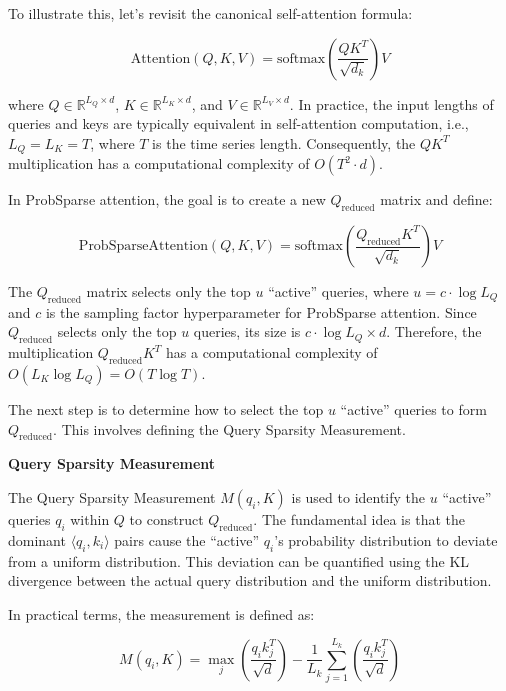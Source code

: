 To illustrate this, let’s revisit the canonical self-attention formula:

\[
\text{Attention}(Q, K, V) = \text{softmax}\left(\frac{QK^T}{\sqrt{d_k}}\right)V
\]

where \( Q \in \mathbb{R}^{L_Q \times d} \), \( K \in \mathbb{R}^{L_K \times d} \), and \( V \in \mathbb{R}^{L_V \times d} \). In practice, the input lengths of queries and keys are typically equivalent in self-attention computation, i.e., \( L_Q = L_K = T \), where \( T \) is the time series length. Consequently, the \( QK^T \) multiplication has a computational complexity of \( O(T^2 \cdot d) \).

In ProbSparse attention, the goal is to create a new \( Q_{\text{reduced}} \) matrix and define:

\begin{equation}
\text{ProbSparseAttention}(Q, K, V) = \text{softmax}\left(\frac{Q_{\text{reduced}} K^T}{\sqrt{d_k}}\right)V
\end{equation}

The \( Q_{\text{reduced}} \) matrix selects only the top \( u \) ``active'' queries, where \( u = c \cdot \log L_Q \) and \( c \) is the sampling factor hyperparameter for ProbSparse attention. Since \( Q_{\text{reduced}} \) selects only the top \( u \) queries, its size is \( c \cdot \log L_Q \times d \). Therefore, the multiplication \( Q_{\text{reduced}} K^T \) has a computational complexity of \( O(L_K \log L_Q) = O(T \log T) \).

The next step is to determine how to select the top \( u \) ``active'' queries to form \( Q_{\text{reduced}} \). This involves defining the Query Sparsity Measurement.
\vspace{10pt}

\noindent\textbf{Query Sparsity Measurement}

\vspace{10pt}
\noindent The Query Sparsity Measurement \( M(q_i, K) \) is used to identify the \( u \) ``active'' queries \( q_i \) within \( Q \) to construct \( Q_{\text{reduced}} \). The fundamental idea is that the dominant \( \langle q_i, k_i \rangle \) pairs cause the ``active'' \( q_i \)'s probability distribution to deviate from a uniform distribution. This deviation can be quantified using the KL divergence between the actual query distribution and the uniform distribution.

In practical terms, the measurement is defined as:

\[
M(q_i, K) = \max_j \left( \frac{q_i k_j^T}{\sqrt{d}} \right) - \frac{1}{L_k} \sum_{j=1}^{L_k} \left( \frac{q_i k_j^T}{\sqrt{d}} \right)
\]

